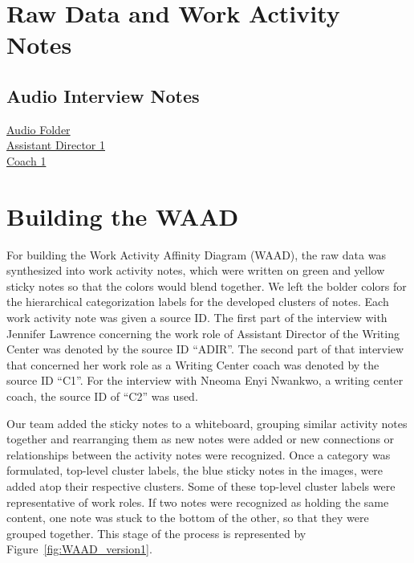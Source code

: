 \documentclass[12pt]{article} %
\begin{document}
\section{Raw Data and Work Activity Notes} %
  \subsection*{Audio Interview Notes} %
  \href{http://www.dropbox.specialorange.com/vt/5714%20UX/}{Audio Folder}\\
    \href{http://www.dropbox.specialorange.com/vt/5714%20UX/ADir1.aac}{Assistant Director 1}\\
    \href{http://www.dropbox.specialorange.com/vt/5714%20UX/C1.aac}{Coach 1}\\

\section{Building the WAAD} %
  For building the Work Activity Affinity Diagram (WAAD), the raw data was synthesized into work activity notes, which were written on green and yellow sticky notes so that the colors would blend together.
  We left the bolder colors for the hierarchical categorization labels for the developed clusters of notes.  Each work activity note was given a source ID.
  The first part of the interview with Jennifer Lawrence concerning the work role of Assistant Director of the Writing Center was denoted by the source ID “ADIR”.
  The second part of that interview that concerned her work role as a Writing Center coach was denoted by the source ID “C1”.
  For the interview with Nneoma Enyi Nwankwo, a writing center coach, the source ID of “C2” was used. 

  Our team added the sticky notes to a whiteboard, grouping similar activity notes together and rearranging them as new notes were added or new connections or relationships between the activity notes were recognized.
  Once a category was formulated, top-level cluster labels, the blue sticky notes in the images, were added atop their respective clusters.
  Some of these top-level cluster labels were representative of work roles.
  If two notes were recognized as holding the same content, one note was stuck to the bottom of the other, so that they were grouped together.
  This stage of the process is represented by Figure~\ref{fig:WAAD_version1}. 
\end{document}
